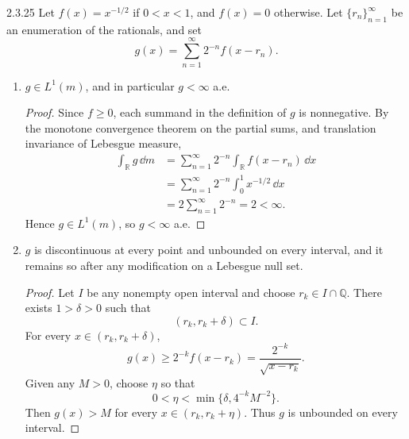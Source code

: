 \documentclass[11pt]{article}
\begin{document}
\begin{problem}{2.3.25}
  Let \( f(x)=x^{-1/2} \) if \( 0<x<1 \), and \( f(x)=0 \) otherwise.
  Let \( \{r_n\}_{n=1}^{\infty} \) be an enumeration of the rationals, and set
  \begin{equation}
    \label{eq:p3-g}
    g(x)=\sum_{n=1}^{\infty}2^{-n}f(x-r_n).
  \end{equation}

  \begin{enumerate}[label=(\alph*)]
    \item \( g\in L^1(m) \), and in particular \( g<\infty \) a.e.
          \begin{proof}
            Since \( f\geq 0 \), each summand in the definition of \( g \) is nonnegative. By the monotone convergence theorem on the partial sums, and translation invariance of Lebesgue measure,
            \begin{equation}
              \label{eq:p3-integral}
              \begin{aligned}
                \int_{\mathbb{R}}g\,\dd{m}
                &=\sum_{n=1}^{\infty}2^{-n}
                  \int_{\mathbb{R}}f(x-r_n)\,\dd{x}\\
                &=\sum_{n=1}^{\infty}2^{-n}
                  \int_0^1x^{-1/2}\,\dd{x}\\
                &=2\sum_{n=1}^{\infty}2^{-n}
                =2<\infty.
              \end{aligned}
            \end{equation}
            Hence \( g\in L^1(m) \), so \( g<\infty \) a.e.
          \end{proof}

    \item \( g \) is discontinuous at every point and unbounded on every interval, and it remains so after any modification on a Lebesgue null set.
          \begin{proof}
            Let \( I \) be any nonempty open interval and choose \( r_k\in I\cap\mathbb{Q} \).
            There exists \( 1 > \delta>0 \) such that
            \begin{equation}
              \label{eq:p3-delta}
              (r_k,r_k+\delta)\subset I.
            \end{equation}
            For every \( x\in(r_k,r_k+\delta) \),
            \begin{equation}
              \label{eq:p3-lower}
              g(x)\geq 2^{-k}f(x-r_k)
              =\frac{2^{-k}}{\sqrt{x-r_k}}.
            \end{equation}
            Given any \( M>0 \), choose \( \eta \) so that
            \begin{equation}
              \label{eq:p3-small-delta}
              0<\eta<\min\{\delta,4^{-k}M^{-2}\}.
            \end{equation}
            Then \( g(x)>M \) for every \( x\in(r_k,r_k+\eta) \).
            Thus \( g \) is unbounded on every interval.


\end{proof}
\end{enumerate}
\end{problem}
\end{document}
